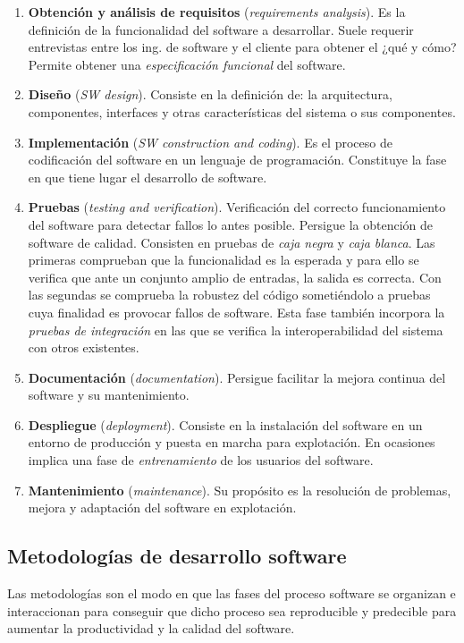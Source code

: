 \begin{enumerate}
\item \textbf{Obtención y análisis de requisitos} (\emph{requirements analysis}). Es la definición de la funcionalidad del software a desarrollar. Suele requerir entrevistas entre los ing. de software y el cliente para obtener el ¿qué y cómo? Permite obtener una \emph{especificación funcional} del software.

\item \textbf{Diseño} (\emph{SW design}). Consiste en la definición de: la arquitectura, componentes, interfaces y otras características del sistema o sus componentes.

\item \textbf{Implementación} (\emph{SW construction and coding}). Es el
  proceso de codificación del software en un lenguaje de programación.
  Constituye la fase en que tiene lugar el desarrollo de software.

\item \textbf{Pruebas} (\emph{testing and verification}). Verificación del correcto funcionamiento del software para detectar fallos lo antes posible. Persigue la obtención de software de calidad. Consisten en pruebas de \emph{caja negra} y \emph{caja blanca}. Las primeras comprueban que la funcionalidad es la esperada y para ello se verifica que ante un conjunto amplio de entradas, la salida es correcta. Con las segundas se comprueba la robustez del código sometiéndolo a pruebas cuya finalidad es provocar fallos de software. Esta fase también incorpora la \emph{pruebas de integración} en las que se verifica la interoperabilidad del sistema con otros existentes.

\item \textbf{Documentación} (\emph{documentation}). Persigue facilitar la mejora continua del software y su mantenimiento.

\item \textbf{Despliegue} (\emph{deployment}). Consiste en la instalación del software en un entorno de producción y puesta en marcha para explotación. En ocasiones implica una fase de \emph{entrenamiento} de los usuarios del software.

\item \textbf{Mantenimiento} (\emph{maintenance}). Su propósito es la resolución de problemas, mejora y adaptación del software en explotación.
\end{enumerate}




\subsection{Metodologías de desarrollo software}
Las metodologías son el modo en que las fases del proceso software se organizan e interaccionan para conseguir que dicho proceso sea reproducible y predecible para aumentar la productividad y la calidad del software.

